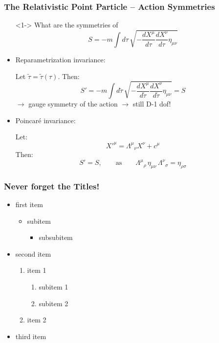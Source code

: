 \documentclass[aspectratio=169]{beamer}
\begin{document}
	\begin{frame}
		\frametitle{The Relativistic Point Particle -- Action Symmetries}
		\begin{itemize}
			\item[]<1-> What are the symmetries of
			\begin{equation*}
				S = -m \int d\tau \, \sqrt{-\frac{dX^\mu}{d\tau} \frac{dX^\nu}{d\tau}\eta_{\mu\nu}}
			\end{equation*}
			\item<2-> Reparametrization invariance:
			\begin{flushleft}
				Let $\tilde{\tau} = \tilde{\tau}(\tau)$. Then:
				\begin{equation*}
					S' = -m \int d\tilde{\tau} \, \sqrt{-\frac{dX^\mu}{d\tilde{\tau}}\frac{dX^\nu}{d\tilde{\tau}}\eta_{\mu\nu}} = S
				\end{equation*}
				$\rightarrow$ gauge symmetry of the action $\rightarrow$ still D-1 dof!
			\end{flushleft}
			\item<2-> Poincaré invariance:
			\begin{flushleft}
				Let:
				\begin{equation*}
					X'^\mu = \Lambda^\mu{}_\nu X^\nu + c^\mu
				\end{equation*}
				Then:
				\begin{equation*}
					S'=S, \qquad \text{as} \qquad \Lambda^\mu{}_\rho \, \eta_{\mu\nu} \, \Lambda^\nu{}_\sigma = \eta_{\rho\sigma}
				\end{equation*}
			\end{flushleft}
		\end{itemize}
	\end{frame}
	
	\begin{frame}
		\frametitle{Never forget the Titles!}
		\begin{itemize}
			\item<1,2,3,4,5> first item 
			\begin{itemize}
				\item<2,3,4,5> subitem
				\begin{itemize}
					\item<3,4,5> subsubitem
				\end{itemize}
			\end{itemize}
			\item<4,5>second item
			\begin{enumerate}
				\item item 1
				\begin{enumerate}
					\item subitem 1
					\item subitem 2
				\end{enumerate}
				\item item 2
			\end{enumerate}
			\item<5>third item
		\end{itemize}	
	\end{frame}
\end{document}
